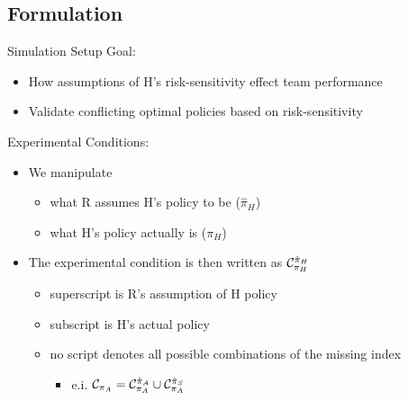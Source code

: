 \documentclass[aspectratio=1610, xcolor=dvipsnames]{packages/beamer}
\begin{document}
\subsection{Formulation}
\begin{frame}{Simulation Setup}
    Goal: \begin{itemize}
        \item How assumptions of H's risk-sensitivity effect team performance
        \item Validate conflicting optimal policies based on risk-sensitivity
    \end{itemize}
    Experimental Conditions: \begin{itemize}
        \item We manipulate
        \begin{itemize}
            \item what R assumes H's policy to be ($\hat{\pi}_{H}$)
            \item what H's policy actually is ($\pi_{H}$)
        \end{itemize}
        \item The experimental condition is then written as $\cond[H][H]$
        \begin{itemize}
             \item superscript is R's assumption of H policy
             \item subscript is H's actual policy
            \item no script denotes all possible combinations of the missing index
            \begin{itemize}
                \item e.i. $\cond[][A] =\cond[A][A] \cup \cond[S][A]$
            \end{itemize}
        \end{itemize}

    \end{itemize}
\end{frame}
\end{document}
